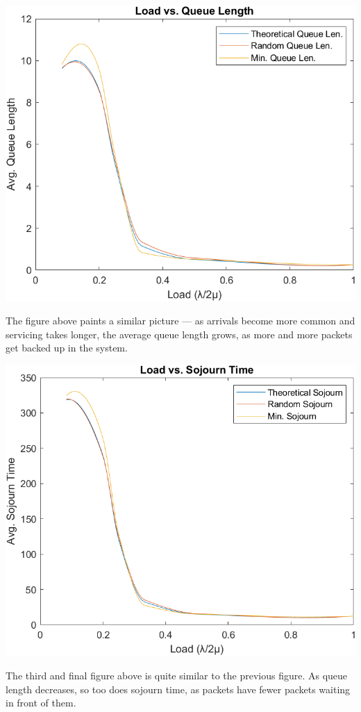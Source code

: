 \documentclass[11pt]{article} %
\begin{document}
\begin{center}
\includegraphics[width=.875\textwidth]{8}
\end{center}

The figure above paints a similar picture — as arrivals become more common and servicing takes longer, the average queue length grows, as more and more packets get backed up in the system.

\begin{center}
\includegraphics[width=.875\textwidth]{9}
\end{center}

The third and final figure above is quite similar to the previous figure. As queue length decreases, so too does sojourn time, as packets have fewer packets waiting in front of them.
\end{document}
